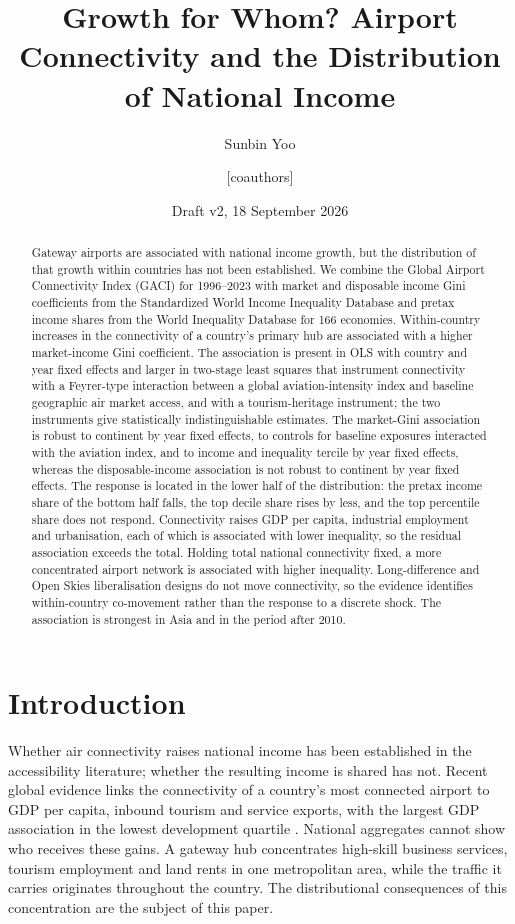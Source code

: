 \documentclass[12pt]{article}
\title{Growth for Whom? Airport Connectivity and the Distribution of National Income}
\author{Sunbin Yoo \and [coauthors]}
\date{Draft v2, 18 September 2026}
\begin{document}
\maketitle

\begin{abstract}
Gateway airports are associated with national income growth, but the distribution of that growth within countries has not been established. We combine the Global Airport Connectivity Index (GACI) for 1996--2023 with market and disposable income Gini coefficients from the Standardized World Income Inequality Database and pretax income shares from the World Inequality Database for 166 economies. Within-country increases in the connectivity of a country's primary hub are associated with a higher market-income Gini coefficient. The association is present in OLS with country and year fixed effects and larger in two-stage least squares that instrument connectivity with a Feyrer-type interaction between a global aviation-intensity index and baseline geographic air market access, and with a tourism-heritage instrument; the two instruments give statistically indistinguishable estimates. The market-Gini association is robust to continent by year fixed effects, to controls for baseline exposures interacted with the aviation index, and to income and inequality tercile by year fixed effects, whereas the disposable-income association is not robust to continent by year fixed effects. The response is located in the lower half of the distribution: the pretax income share of the bottom half falls, the top decile share rises by less, and the top percentile share does not respond. Connectivity raises GDP per capita, industrial employment and urbanisation, each of which is associated with lower inequality, so the residual association exceeds the total. Holding total national connectivity fixed, a more concentrated airport network is associated with higher inequality. Long-difference and Open Skies liberalisation designs do not move connectivity, so the evidence identifies within-country co-movement rather than the response to a discrete shock. The association is strongest in Asia and in the period after 2010.
\end{abstract}

\section{Introduction}
\label{sec:intro}
Whether air connectivity raises national income has been established in the accessibility literature; whether the resulting income is shared has not. Recent global evidence links the connectivity of a country's most connected airport to GDP per capita, inbound tourism and service exports, with the largest GDP association in the lowest development quartile \citep{Yue_2026}. National aggregates cannot show who receives these gains. A gateway hub concentrates high-skill business services, tourism employment and land rents in one metropolitan area, while the traffic it carries originates throughout the country. The distributional consequences of this concentration are the subject of this paper.
\end{document}
